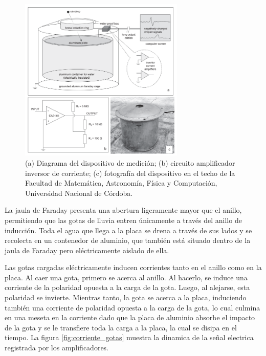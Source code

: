 \documentclass[12pt,a4paper]{article}
\begin{document}
\begin{figure}[H]
    \centering
    \includegraphics[width=0.7\textwidth]{figures/instrumento_de_medicion.png}
    \caption{(a) Diagrama del dispositivo de medición; (b) circuito amplificador inversor de corriente; (c) fotografía del dispositivo en el techo de la Facultad de Matemática, Astronomía, Física y Computación, Universidad Nacional de Córdoba.}
    \label{fig:instrumento_medicion}
\end{figure}

La jaula de Faraday presenta una abertura ligeramente mayor que el anillo, permitiendo que las gotas de lluvia entren únicamente a través del anillo de inducción. Toda el agua que llega a la placa se drena a través de sus lados y se recolecta en un contenedor de aluminio, que también está situado dentro de la jaula de Faraday pero eléctricamente aislado de ella.

Las gotas cargadas eléctricamente inducen corrientes tanto en el anillo como en la placa. Al caer una gota, primero se acerca al anillo. Al hacerlo, se induce una corriente de la polaridad opuesta a la carga de la gota. Luego, al alejarse, esta polaridad se invierte. Mientras tanto, la gota se acerca a la placa, induciendo también una corriente de polaridad opuesta a la carga de la gota, lo cual culmina en una meseta en la corriente dado que la placa de aluminio absorbe el impacto de la gota y se le transfiere toda la carga a la placa, la cual se disipa en el tiempo. La figura \ref{fig:corriente_gotas} muestra la dinamica de la señal electrica registrada por los amplificadores.
\end{document}
